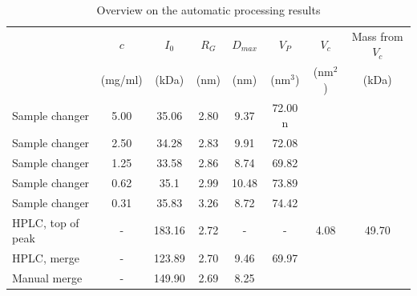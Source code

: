 \documentclass[preprint,pdf]{iucr}              %
\begin{document}
\begin{table}
\begin{tabular}{ l c | c c c c c c }
   & $c$  & $I_{0}$  & $R_{G}$ & $D_{max}$ & $V_{P}$ & $V_{c}$ & Mass from $V_{c}$\\
	 &  (mg/ml) & (kDa) & (nm)&  (nm)&  (nm$^{3}$) & (nm$^{2}$) & (kDa)\\
\hline 
Sample changer & 5.00  & 35.06 & 2.80 & 9.37  & 72.00 n& &  \\
Sample changer & 2.50  & 34.28 & 2.83  & 9.91  & 72.08 & &  \\
Sample changer & 1.25 & 33.58& 2.86  & 8.74  & 69.82 & &  \\
Sample changer & 0.62  & 35.1& 2.99  & 10.48 & 73.89 & &  \\
Sample changer & 0.31 & 35.83  & 3.26  & 8.72  & 74.42& &  \\
HPLC, top of peak & - & 183.16 & 2.72  & -  & - & 4.08 & 49.70 \\
HPLC, merge & - & 123.89 & 2.70  & 9.46 & 69.97 & &  \\
Manual merge & - &  149.90 & 2.69 & 8.25 & & &  \\
\end{tabular}
\caption{Overview on the automatic processing results }
\label{tbl:results}
\end{table}
\end{document}
